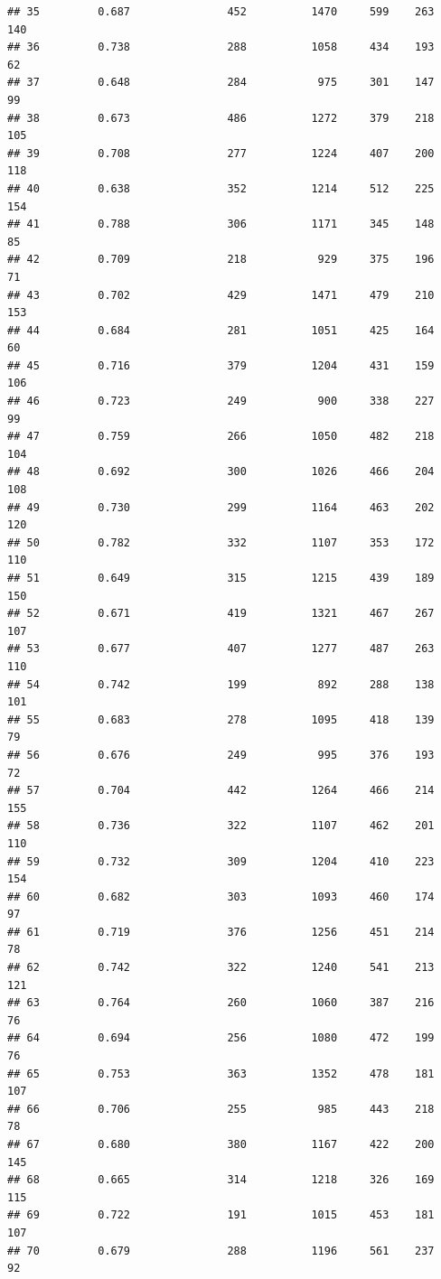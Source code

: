 \documentclass[]{book}
\begin{document}
\begin{verbatim}
## 35         0.687               452          1470     599    263    140
## 36         0.738               288          1058     434    193     62
## 37         0.648               284           975     301    147     99
## 38         0.673               486          1272     379    218    105
## 39         0.708               277          1224     407    200    118
## 40         0.638               352          1214     512    225    154
## 41         0.788               306          1171     345    148     85
## 42         0.709               218           929     375    196     71
## 43         0.702               429          1471     479    210    153
## 44         0.684               281          1051     425    164     60
## 45         0.716               379          1204     431    159    106
## 46         0.723               249           900     338    227     99
## 47         0.759               266          1050     482    218    104
## 48         0.692               300          1026     466    204    108
## 49         0.730               299          1164     463    202    120
## 50         0.782               332          1107     353    172    110
## 51         0.649               315          1215     439    189    150
## 52         0.671               419          1321     467    267    107
## 53         0.677               407          1277     487    263    110
## 54         0.742               199           892     288    138    101
## 55         0.683               278          1095     418    139     79
## 56         0.676               249           995     376    193     72
## 57         0.704               442          1264     466    214    155
## 58         0.736               322          1107     462    201    110
## 59         0.732               309          1204     410    223    154
## 60         0.682               303          1093     460    174     97
## 61         0.719               376          1256     451    214     78
## 62         0.742               322          1240     541    213    121
## 63         0.764               260          1060     387    216     76
## 64         0.694               256          1080     472    199     76
## 65         0.753               363          1352     478    181    107
## 66         0.706               255           985     443    218     78
## 67         0.680               380          1167     422    200    145
## 68         0.665               314          1218     326    169    115
## 69         0.722               191          1015     453    181    107
## 70         0.679               288          1196     561    237     92

\end{verbatim}
\end{document}
